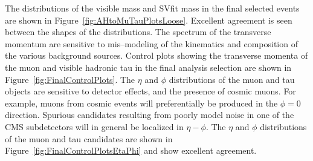 The distributions of the visible mass and SVfit mass in the final selected
events are shown in Figure~\ref{fig:AHtoMuTauPlotsLoose}.  Excellent agreement
is seen between the shapes of the distributions.   The \pt spectrum of
the transverse momentum are sensitive to mis--modeling of the kinematics and
composition of the various background sources. Control plots showing the
transverse momenta of the muon and visible hadronic tau in the final analysis
selection are shown in Figure~\ref{fig:FinalControlPlots}.  The $\eta$ and $\phi$
distributions of the muon and tau objects are sensitive to detector effects, and
the presence of cosmic muons.  For example, muons from cosmic events will
preferentially be produced in the \mbox{$\phi=0$} direction.  Spurious candidates
resulting from poorly model noise in one of the CMS subdetectors will in general
be localized in $\eta-\phi$.  The $\eta$ and $\phi$ distributions of the muon
and tau candidates are shown in Figure~\ref{fig:FinalControlPlotsEtaPhi} and
show excellent agreement.
